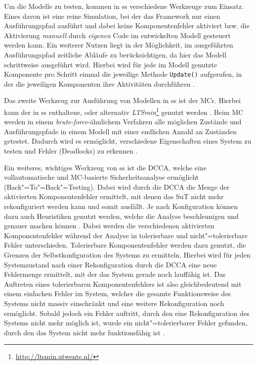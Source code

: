 Um die Modelle zu testen, kommen in \gls{ss} verschiedene Werkzeuge zum Einsatz.
Eines davon ist eine reine Simulation, bei der das Framework nur einen Ausführungspfad ausführt und dabei keine Komponentenfehler aktiviert bzw. die Aktivierung \emph{manuell} durch \emph{eigenen} Code im entwickelten Modell gesteuert werden kann.
Ein weiterer Nutzen liegt in der Möglichkeit, im ausgeführten Ausführungspfad zeitliche Abläufe zu berücksichtigen, da hier das Modell schrittweise ausgeführt wird.
Hierbei wird für jede im Modell genutzte Komponente pro Schritt einmal die jeweilige Methode \texttt{Update()} aufgerufen, in der die jeweiligen Komponenten ihre Aktivitäten durchführen \cite{Habermaier2016}.

Das zweite Werkzeug zur Ausführung von Modellen in \gls{ss} ist der \gls{MCr}.
Hierbei kann der in \gls{ss} enthaltene, oder alternativ \emph{LTSmin}\footnote{\url{http://ltsmin.utwente.nl/}} genutzt werden \cite{SSWikiModelChecking,Habermaier2016}.
Beim \gls{MC} werden in einem \emph{brute-force}-ähnlichem Verfahren alle möglichen Zustände und Ausführungspfade in einem Modell mit einer endlichen Anzahl an Zuständen getestet.
Dadurch wird es ermöglicht, verschiedene Eigenschaften eines System zu testen und Fehler (\zB Deadlocks) zu erkennen \cite{Grumberg1999}.

Ein weiteres, wichtiges Werkzeug von \gls{ss} ist die \gls{DCCA}, welche eine vollautomatische und \gls{MC}-basierte Sicherheitsanalyse ermöglicht (Back"=To"=Back"=Testing).
Dabei wird durch die \gls{DCCA} die Menge der aktivierten Komponentenfehler ermittelt, mit denen das \gls{SuT} nicht mehr rekonfiguriert werden kann und somit ausfällt.
Je nach Konfiguration können dazu auch Heuristiken genutzt werden, welche die Analyse beschleunigen und genauer machen können \cite{Eberhardinger2016}.
Dabei werden die verschiedenen aktivierten Komponentenfehler während der Analyse in tolerierbare und nicht"=tolerierbare Fehler unterschieden.
Tolerierbare Komponentenfehler werden dazu genutzt, die Grenzen der Selbstkonfiguration des Systems zu ermitteln.
Hierbei wird für jeden Systemzustand nach einer Rekonfiguration durch die \gls{DCCA} eine neue Fehlermenge ermittelt, mit der das System gerade noch lauffähig ist.
Das Auftreten eines tolerierbaren Komponentenfehlers ist also gleichbedeutend mit einem einfachen Fehler im System, welcher die gesamte Funktionsweise des Systems nicht massiv einschränkt und eine weitere Rekonfiguration noch ermöglicht.
Sobald jedoch ein Fehler auftritt, durch den eine Rekonfiguration des Systems nicht mehr möglich ist, wurde ein nicht"=tolerierbarer Fehler gefunden, durch den das System nicht mehr funktionsfähig ist \cite{Habermaier2015}.
